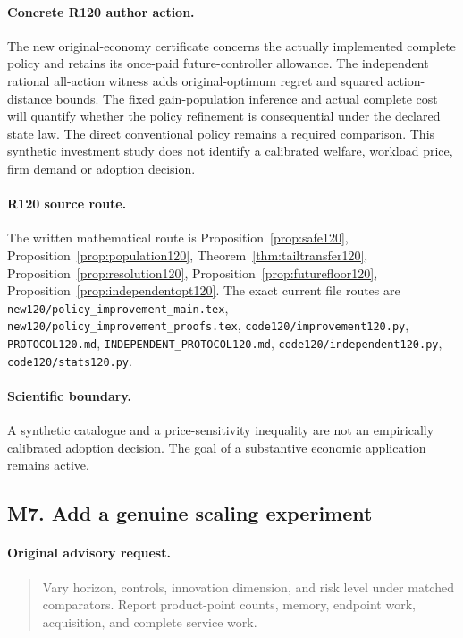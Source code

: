 \paragraph{Concrete R120 author action.}
The new original-economy certificate concerns the actually implemented complete policy and retains its once-paid future-controller allowance. The independent rational all-action witness adds original-optimum regret and squared action-distance bounds. The fixed gain-population inference and actual complete cost will quantify whether the policy refinement is consequential under the declared state law. The direct conventional policy remains a required comparison. This synthetic investment study does not identify a calibrated welfare, workload price, firm demand or adoption decision.
\paragraph{R120 source route.}
The written mathematical route is Proposition~\ref{prop:safe120}, Proposition~\ref{prop:population120}, Theorem~\ref{thm:tailtransfer120}, Proposition~\ref{prop:resolution120}, Proposition~\ref{prop:futurefloor120}, Proposition~\ref{prop:independentopt120}. The exact current file routes are \nolinkurl{new120/policy_improvement_main.tex}, \nolinkurl{new120/policy_improvement_proofs.tex}, \nolinkurl{code120/improvement120.py}, \nolinkurl{PROTOCOL120.md}, \nolinkurl{INDEPENDENT_PROTOCOL120.md}, \nolinkurl{code120/independent120.py}, \nolinkurl{code120/stats120.py}.
\paragraph{Scientific boundary.}
A synthetic catalogue and a price-sensitivity inequality are not an empirically calibrated adoption decision. The goal of a substantive economic application remains active.

\subsection{M7. Add a genuine scaling experiment}
\label{response120:M7}
\paragraph{Original advisory request.}
\begin{quote}
Vary horizon, controls, innovation dimension, and risk level under matched comparators. Report product-point counts, memory, endpoint work, acquisition, and complete service work.
\end{quote}
